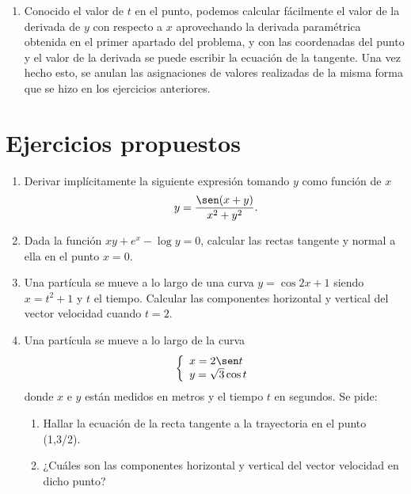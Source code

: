 \begin{enumerate}[leftmargin=*]
\begin{enumerate}
\begin{indicacion}
{\begin{enumerate}
\item Conocido el valor de $t$ en el punto, podemos calcular fácilmente
el valor de la derivada de $y$ con respecto a $x$ aprovechando la
derivada paramétrica obtenida en el primer apartado del problema, y
con las coordenadas del punto y el valor de la derivada se puede
escribir la ecuación de la tangente. Una vez hecho esto, se anulan
las asignaciones de valores realizadas de la misma forma que se hizo
en los ejercicios anteriores.
\end{enumerate}}
\end{indicacion}
\end{enumerate}
\end{enumerate}


\section{Ejercicios propuestos}

\begin{enumerate}[leftmargin=*]
\item Derivar implícitamente la siguiente expresión tomando $y$ como función de $x$
\[
\ y=\frac{\sen(x+y)}{x^{2}+y^{2}}.
\]
\item Dada la función $xy+e^{x}-\log{y}=0$, calcular las rectas tangente y normal a ella en el punto $x=0$.

\item Una partícula se mueve a lo largo de una curva $y=\cos{2x+1}$ siendo $x=t^2+1$ y $t$ el tiempo. Calcular las componentes horizontal y vertical del vector velocidad cuando $t=2$.

\item  Una partícula se mueve a lo largo de la curva
\[\left\{
\begin{array}{l}
x=2\sen t\\
y=\sqrt{3}\cos{t}
\end{array}
\right.
\]
donde $x$ e $y$ están medidos en metros y el tiempo $t$ en segundos.
Se pide:
\begin{enumerate}
\item Hallar la ecuación de la recta tangente a la trayectoria en el punto (1,3/2).

\item ¿Cuáles son las componentes horizontal y vertical del vector velocidad en dicho punto?
\end{enumerate}
\end{enumerate}












